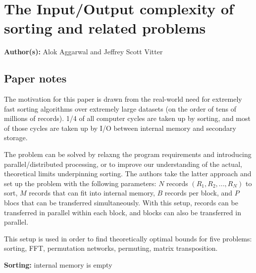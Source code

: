 \section{The Input/Output complexity of sorting and related problems}

\textbf{Author(s):} Alok Aggarwal and Jeffrey Scott Vitter

\subsection{Paper notes}

The motivation for this paper is drawn from the real-world need for extremely fast sorting algorithms over extremely large datasets (on the order of tens of millions of records). 1/4 of all computer cycles are taken up by sorting, and most of those cycles are taken up by I/O between internal memory and secondary storage. 

The problem can be solved by relaxng the program requirements and introducing parallel/distributed processing, or to improve our understanding of the actual, theoretical limits underpinning sorting. The authors take the latter approach and set up the problem with the following parameters: $N$ records $(R_1, R_2, ..., R_N)$ to sort, $M$ records that can fit into internal memory, $B$ records per block, and $P$ blocs that can be transferred simultaneously. With this setup, records can be transferred in parallel within each block, and blocks can also be transferred in parallel. 

This setup is used in order to find theoretically optimal bounds for five problems: sorting, FFT, permutation networks, permuting, matrix transposition. 

\textbf{Sorting: } internal memory is empty